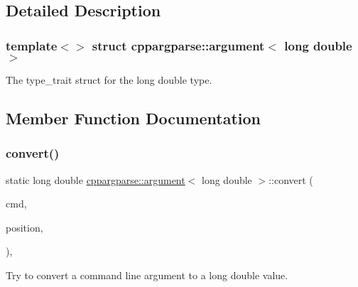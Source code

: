 \subsection{Detailed Description}
\subsubsection*{template$<$$>$\newline
struct cppargparse\+::argument$<$ long double $>$}

The type\+\_\+trait struct for the long double type. 

\subsection{Member Function Documentation}
\mbox{\label{structcppargparse_1_1argument_3_01long_01double_01_4_a954e555300e80f577a4d9634cfe5054a}} 
\subsubsection{\texorpdfstring{convert()}{convert()}}
{\footnotesize\ttfamily static long double \hyperlink{structcppargparse_1_1argument}{cppargparse\+::argument}$<$ long double $>$\+::convert (\begin{DoxyParamCaption}\item[{const \hyperlink{types_8h_a80adf2418b7ce9fe616698efa7533ecf}{types\+::\+Command\+Line\+\_\+t} \&}]{cmd,  }\item[{const \hyperlink{types_8h_a43b4f43f8940de1bf09ced6f1b668053}{types\+::\+Command\+Line\+Position\+\_\+t} \&}]{position,  }\item[{const \hyperlink{types_8h_a003c660afe2ee9c6cc39aea966e8926d}{types\+::\+Command\+Line\+Arguments\+\_\+t} \&}]{ }\end{DoxyParamCaption})\hspace{0.3cm}{\ttfamily [inline]}, {\ttfamily [static]}}



Try to convert a command line argument to a long double value. 


